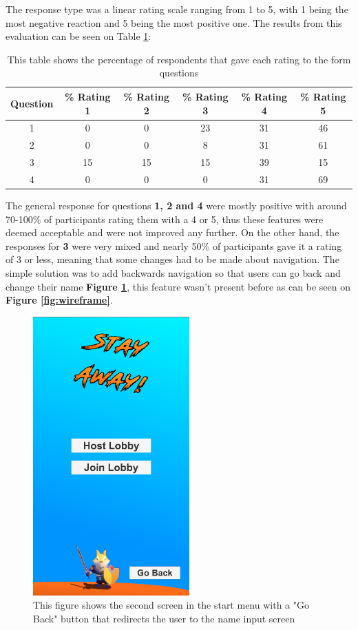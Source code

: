 \documentclass{dissertation}
\begin{document}
The response type was a linear rating scale ranging from 1 to 5, with 1 being the most negative reaction and 5 being the most positive one. The results from this evaluation can be seen on Table \ref{table:1}:

\begin{table}
\begin{center}
\begin{tabular}{ c || c | c | c | c | c  }
\hline 
\textbf{Question} & \textbf{\% Rating 1} & \textbf{\% Rating 2} & \textbf{\% Rating 3} & \textbf{\% Rating 4} & \textbf{\% Rating 5} \\ [0.5 ex]
\hline
1 & 0 & 0 & 23 & 31 & 46 \\
\hline
2 & 0 & 0 & 8 & 31 & 61\\
\hline
3 & 15 & 15 & 15 & 39 & 15\\
\hline
4 & 0 & 0 & 0 & 31 & 69\\
\hline
\end{tabular}
\caption{This table shows the percentage of respondents that gave each rating to the form questions}
\label{table:1}
\end{center}
\end{table}

The general response for questions \textbf{1, 2 and 4} were mostly positive with around 70-100\% of participants rating them with a 4 or 5, thus these features were deemed acceptable and were not improved any further. On the other hand, the responses for \textbf{3} were very mixed and nearly 50\% of participants gave it a rating of 3 or less, meaning that some changes had to be made about navigation. The simple solution was to add backwards navigation so that users can go back and change their name \textbf{Figure \ref{fig:back-button}}, this feature wasn't present before as can be seen on \textbf{Figure \ref{fig:wireframe}}.

\begin{figure}[H]
\centering
\includegraphics[width = 6cm]{images/back-button.png}
\caption{This figure shows the second screen in the start menu with a "Go Back" button that redirects the user to the name input screen}
\label{fig:back-button}
\end{figure}
\end{document}
